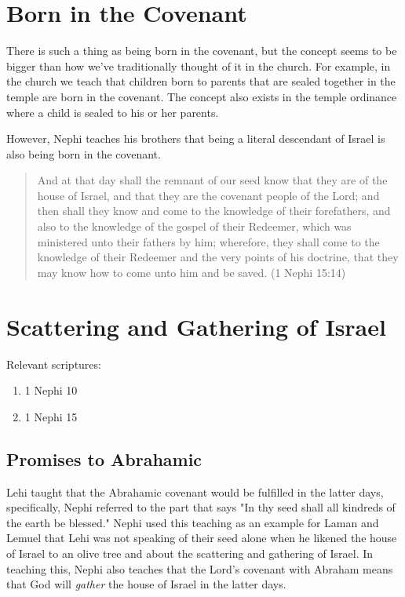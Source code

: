 \section{Born in the Covenant}

There is such a thing as being born in the covenant, but the concept seems to be bigger than how we've traditionally thought of it in the church. For example, in the church we teach that children born to parents that are sealed together in the temple are born in the covenant. The concept also exists in the temple ordinance where a child is sealed to his or her parents.

However, Nephi teaches his brothers that being a literal descendant of Israel is also being born in the covenant. 

\begin{quotation}
And at that day shall the remnant of our seed know that they are of the house of Israel, and that they are the covenant people of the Lord; and then shall they know and come to the knowledge of their forefathers, and also to the knowledge of the gospel of their Redeemer, which was ministered unto their fathers by him; wherefore, they shall come to the knowledge of their Redeemer and the very points of his doctrine, that they may know how to come unto him and be saved. (1 Nephi 15:14)
\end{quotation}

\section{Scattering and Gathering of Israel}

Relevant scriptures:
\begin{enumerate}
  \item 1 Nephi 10
  \item 1 Nephi 15
\end{enumerate}

\subsection{Promises to Abrahamic}

Lehi taught that the Abrahamic covenant would be fulfilled in the latter days, specifically, Nephi referred to the part that says "In thy seed shall all kindreds of the earth be blessed." Nephi used this teaching as an example for Laman and Lemuel that Lehi was not speaking of their seed alone when he likened the house of Israel to an olive tree and about the scattering and gathering of Israel. In teaching this, Nephi also teaches that the Lord's covenant with Abraham means that God will \textit{gather} the house of Israel in the latter days.

